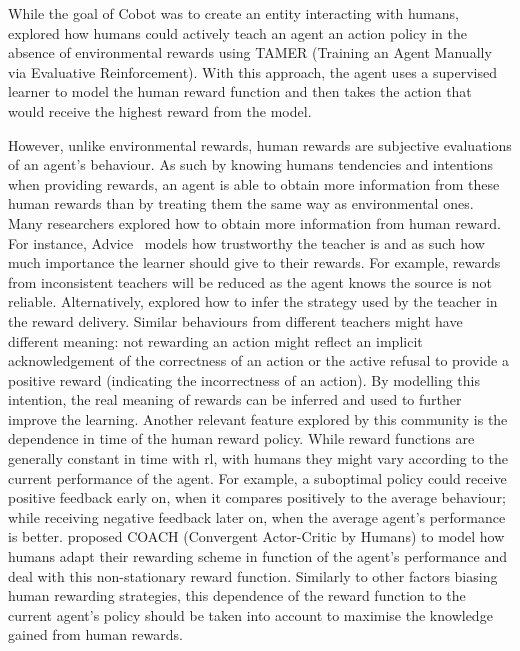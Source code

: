 While the goal of Cobot was to create an entity interacting with humans, \cite{knox2009interactively} explored how humans could actively teach an agent an action policy in the absence of environmental rewards using TAMER (Training an Agent Manually via Evaluative Reinforcement). With this approach, the agent uses a supervised learner to model the human reward function and then takes the action that would receive the highest reward from the model. 

However, unlike environmental rewards, human rewards are subjective evaluations of an agent's behaviour. As such by knowing humans tendencies and intentions when providing rewards, an agent is able to obtain more information from these human rewards than by treating them the same way as environmental ones. Many researchers explored how to obtain more information from human reward. For instance, Advice~\citep{griffith2013policy} models how trustworthy the teacher is and as such how much importance the learner should give to their rewards. For example, rewards from inconsistent teachers will be reduced as the agent knows the source is not reliable. Alternatively, \cite{loftin2016learning} explored how to infer the strategy used by the teacher in the reward delivery. Similar behaviours from different teachers might have different meaning: not rewarding an action might reflect an implicit acknowledgement of the correctness of an action or the active refusal to provide a positive reward (indicating the incorrectness of an action). By modelling this intention, the real meaning of rewards can be inferred and used to further improve the learning. Another relevant feature explored by this community is the dependence in time of the human reward policy. While reward functions are generally constant in time with \gls{rl}, with humans they might vary according to the current performance of the agent. For example, a suboptimal policy could receive positive feedback early on, when it compares positively to the average behaviour; while receiving negative feedback later on, when the average agent's performance is better. \cite{macglashan2017interactive} proposed COACH (Convergent Actor-Critic by Humans) to model how humans adapt their rewarding scheme in function of the agent's performance and deal with this non-stationary reward function. Similarly to other factors biasing human rewarding strategies, this dependence of the reward function to the current agent's policy should be taken into account to maximise the knowledge gained from human rewards.

